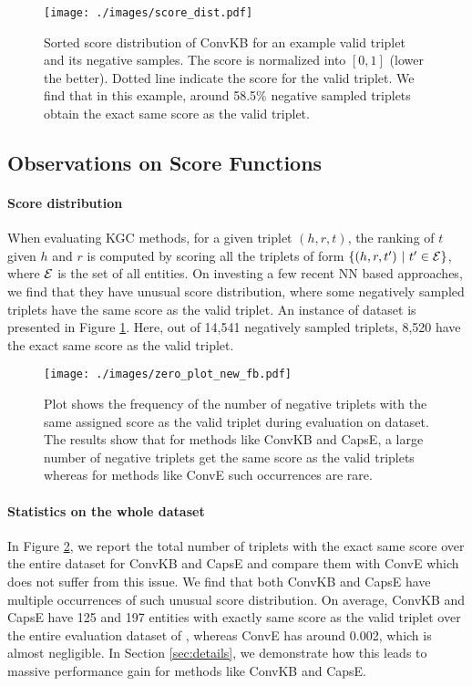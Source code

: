 \documentclass[11pt,a4paper]{article}
\begin{document}
\begin{figure}[t]
	\centering
	\texttt{[image: ./images/score\_dist.pdf]}
	\caption{\label{fig:score_dist} Sorted score distribution of ConvKB for an example valid triplet and its negative samples. The score is normalized into $[0, 1]$ (lower the better). Dotted line indicate the score for the valid triplet. We find that in this example, around 58.5\% negative sampled triplets obtain the exact same score as the valid triplet. }  
\end{figure}



\subsection{Observations on Score Functions}
\label{sec:score_dist}

\paragraph{Score distribution}
When evaluating KGC methods, for a given triplet $(h,r,t)$, the ranking of $t$ given $h$ and $r$ is computed by scoring all the triplets of form $\{(h,r,t') \ |\  t' \in \mathcal{E}\}$, where $\mathcal{E}$ is the set of all entities. On investing a few recent NN based approaches, we find that they have unusual score distribution, where some negatively sampled triplets have the same score as the valid triplet. An instance of \datafb{} dataset is presented in Figure \ref{fig:score_dist}. Here, out of 14,541 negatively sampled triplets, 8,520 have the exact same score as the valid triplet.



\begin{figure}[t]
	\centering
	\texttt{[image: ./images/zero\_plot\_new\_fb.pdf]}
	\caption{\label{fig:samescr_plot}Plot shows the frequency of the number of negative triplets with the same assigned score as the valid triplet during evaluation on \datafb{} dataset. The results show that for methods like ConvKB and CapsE, a large number of negative triplets get the same score as the valid triplets whereas for methods like ConvE such occurrences are rare.
	} \end{figure}

\paragraph{Statistics on the whole dataset}
In Figure \ref{fig:samescr_plot}, we report the total number of triplets with the exact same score over the entire dataset for ConvKB \cite{convkb} and CapsE \cite{capse} and compare them with ConvE \cite{conve} which does not suffer from this issue. We find that both ConvKB and CapsE have multiple occurrences of such unusual score distribution. On average, ConvKB and CapsE have 125 and 197 entities with exactly same score as the valid triplet over the entire evaluation dataset of \datafb{}, whereas ConvE has around 0.002, which is almost negligible. In Section \ref{sec:details}, we demonstrate how this leads to massive performance gain for methods like ConvKB and CapsE. 
\end{document}
